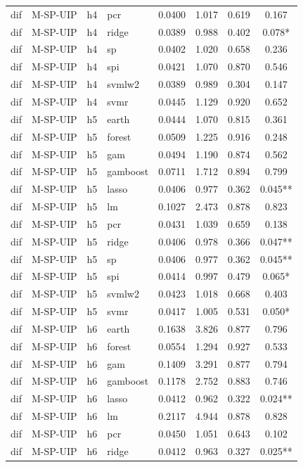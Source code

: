 \begin{ThreePartTable}
\begin{longtable}[t]{llclcccc}
dif & M-SP-UIP & h4 & pcr & 0.0400 & 1.017 & 0.619 & 0.167\\
dif & M-SP-UIP & h4 & ridge & 0.0389 & 0.988 & 0.402 & 0.078*\\
dif & M-SP-UIP & h4 & sp & 0.0402 & 1.020 & 0.658 & 0.236\\
dif & M-SP-UIP & h4 & spi & 0.0421 & 1.070 & 0.870 & 0.546\\
dif & M-SP-UIP & h4 & svmlw2 & 0.0389 & 0.989 & 0.304 & 0.147\\
dif & M-SP-UIP & h4 & svmr & 0.0445 & 1.129 & 0.920 & 0.652\\
\addlinespace
dif & M-SP-UIP & h5 & earth & 0.0444 & 1.070 & 0.815 & 0.361\\
dif & M-SP-UIP & h5 & forest & 0.0509 & 1.225 & 0.916 & 0.248\\
dif & M-SP-UIP & h5 & gam & 0.0494 & 1.190 & 0.874 & 0.562\\
dif & M-SP-UIP & h5 & gamboost & 0.0711 & 1.712 & 0.894 & 0.799\\
dif & M-SP-UIP & h5 & lasso & 0.0406 & 0.977 & 0.362 & 0.045**\\
dif & M-SP-UIP & h5 & lm & 0.1027 & 2.473 & 0.878 & 0.823\\
dif & M-SP-UIP & h5 & pcr & 0.0431 & 1.039 & 0.659 & 0.138\\
dif & M-SP-UIP & h5 & ridge & 0.0406 & 0.978 & 0.366 & 0.047**\\
dif & M-SP-UIP & h5 & sp & 0.0406 & 0.977 & 0.362 & 0.045**\\
dif & M-SP-UIP & h5 & spi & 0.0414 & 0.997 & 0.479 & 0.065*\\
dif & M-SP-UIP & h5 & svmlw2 & 0.0423 & 1.018 & 0.668 & 0.403\\
dif & M-SP-UIP & h5 & svmr & 0.0417 & 1.005 & 0.531 & 0.050*\\
\addlinespace
dif & M-SP-UIP & h6 & earth & 0.1638 & 3.826 & 0.877 & 0.796\\
dif & M-SP-UIP & h6 & forest & 0.0554 & 1.294 & 0.927 & 0.533\\
dif & M-SP-UIP & h6 & gam & 0.1409 & 3.291 & 0.877 & 0.794\\
dif & M-SP-UIP & h6 & gamboost & 0.1178 & 2.752 & 0.883 & 0.746\\
dif & M-SP-UIP & h6 & lasso & 0.0412 & 0.962 & 0.322 & 0.024**\\
dif & M-SP-UIP & h6 & lm & 0.2117 & 4.944 & 0.878 & 0.828\\
dif & M-SP-UIP & h6 & pcr & 0.0450 & 1.051 & 0.643 & 0.102\\
dif & M-SP-UIP & h6 & ridge & 0.0412 & 0.963 & 0.327 & 0.025**\\

\end{longtable}
\end{ThreePartTable}
